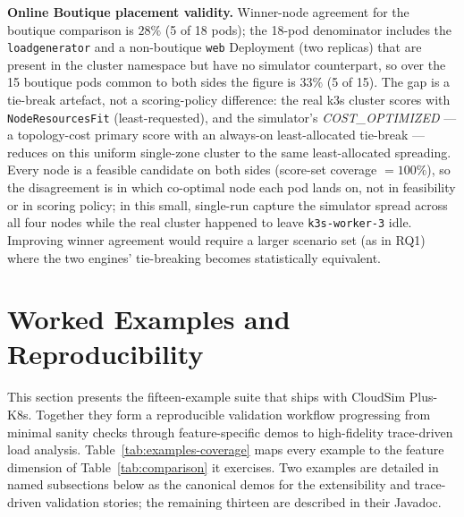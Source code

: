 \documentclass[ASNA,twocolumn]{USG}
\newcommand{\ckm}{CloudSim Plus-K8s\xspace}
\begin{document}
    \textbf{Online Boutique placement validity.}
    Winner-node agreement for the boutique comparison is $28\%$ (5 of 18
    pods); the 18-pod denominator includes the \texttt{loadgenerator} and a
    non-boutique \texttt{web} Deployment (two replicas) that are present in
    the cluster namespace but have no simulator counterpart, so over the 15
    boutique pods common to both sides the figure is $33\%$ (5 of 15). The
    gap is a tie-break artefact, not a scoring-policy difference: the real
    k3s cluster scores with \texttt{NodeResourcesFit} (least-requested),
    and the simulator's \emph{COST\_OPTIMIZED} --- a topology-cost primary
    score with an always-on least-allocated tie-break --- reduces on this
    uniform single-zone cluster to the same least-allocated spreading.
    Every node is a feasible candidate on both sides (score-set coverage
    $= 100\%$), so the disagreement is in which co-optimal node each pod
    lands on, not in feasibility or in scoring policy; in this small,
    single-run capture the simulator spread across all four nodes while the
    real cluster happened to leave \texttt{k3s-worker-3} idle. Improving
    winner agreement would require a larger scenario set (as in RQ1) where
    the two engines' tie-breaking becomes statistically equivalent.

    \section{Worked Examples and Reproducibility}\label{sec:examples}

    This section presents the fifteen-example suite that ships with
    \ckm. Together they form a reproducible validation workflow
    progressing from minimal sanity checks through feature-specific
    demos to high-fidelity trace-driven load analysis.
    Table~\ref{tab:examples-coverage} maps every example to the
    feature dimension of Table~\ref{tab:comparison} it exercises.
    Two examples are detailed in named subsections below as the
    canonical demos for the extensibility and trace-driven validation
    stories; the remaining thirteen are described in their Javadoc.
\end{document}
